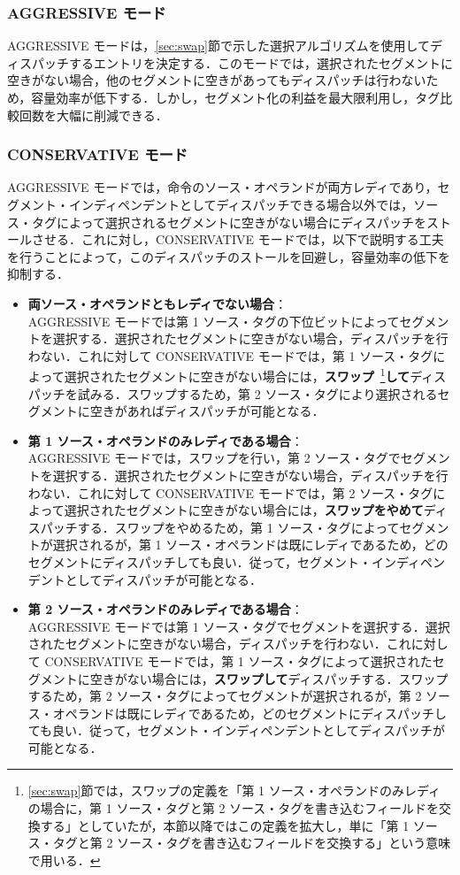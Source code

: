 \documentclass[submit,techrep,noauthor]{ipsj}
\begin{document}
\subsubsection{AGGRESSIVE モード}
AGGRESSIVE モードは，\ref{sec:swap}節で示した選択アルゴリズムを使用してディスパッチするエントリを決定する．このモードでは，選択されたセグメントに空きがない場合，他のセグメントに空きがあってもディスパッチは行わないため，容量効率が低下する．しかし，セグメント化の利益を最大限利用し，タグ比較回数を大幅に削減できる．

\subsubsection{CONSERVATIVE モード}
AGGRESSIVE モードでは，命令のソース・オペランドが両方レディであり，セグメント・インディペンデントとしてディスパッチできる場合以外では，ソース・タグによって選択されるセグメントに空きがない場合にディスパッチをストールさせる．これに対し，CONSERVATIVE モードでは，以下で説明する工夫を行うことによって，このディスパッチのストールを回避し，容量効率の低下を抑制する．
\begin{itemize}
  \item \textbf{両ソース・オペランドともレディでない場合}：\\AGGRESSIVE モードでは第 1 ソース・タグの下位ビットによってセグメントを選択する．選択されたセグメントに空きがない場合，ディスパッチを行わない．これに対して CONSERVATIVE モードでは，第 1 ソース・タグによって選択されたセグメントに空きがない場合には，\textbf{スワップ}~\footnote{\ref{sec:swap}節では，スワップの定義を「第 1 ソース・オペランドのみレディの場合に，第 1 ソース・タグと第 2 ソース・タグを書き込むフィールドを交換する」としていたが，本節以降ではこの定義を拡大し，単に「第 1 ソース・タグと第 2 ソース・タグを書き込むフィールドを交換する」という意味で用いる．}\textbf{して}ディスパッチを試みる．スワップするため，第 2 ソース・タグにより選択されるセグメントに空きがあればディスパッチが可能となる．
  \item \textbf{第 1 ソース・オペランドのみレディである場合}：\\AGGRESSIVE モードでは，スワップを行い，第 2 ソース・タグでセグメントを選択する．選択されたセグメントに空きがない場合，ディスパッチを行わない．これに対して CONSERVATIVE モードでは，第 2 ソース・タグによって選択されたセグメントに空きがない場合には，\textbf{スワップをやめて}ディスパッチする．スワップをやめるため，第 1 ソース・タグによってセグメントが選択されるが，第 1 ソース・オペランドは既にレディであるため，どのセグメントにディスパッチしても良い．従って，セグメント・インディペンデントとしてディスパッチが可能となる．
  \item \textbf{第 2 ソース・オペランドのみレディである場合}：\\AGGRESSIVE モードでは第 1 ソース・タグでセグメントを選択する．選択されたセグメントに空きがない場合，ディスパッチを行わない．これに対して CONSERVATIVE モードでは，第 1 ソース・タグによって選択されたセグメントに空きがない場合には，\textbf{スワップして}ディスパッチする．スワップするため，第 2 ソース・タグによってセグメントが選択されるが，第 2 ソース・オペランドは既にレディであるため，どのセグメントにディスパッチしても良い．従って，セグメント・インディペンデントとしてディスパッチが可能となる．
\end{itemize}
\end{document}
